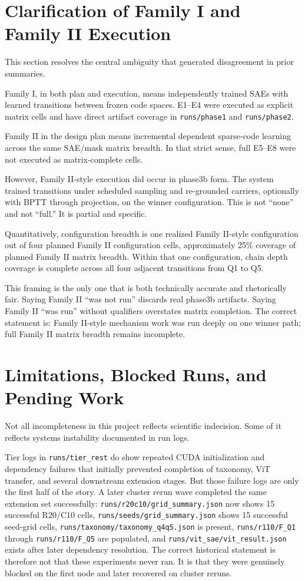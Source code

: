 \documentclass[11pt]{article}
\begin{document}
\section{Clarification of Family I and Family II Execution}
This section resolves the central ambiguity that generated disagreement in prior summaries.

Family I, in both plan and execution, means independently trained SAEs with learned transitions between frozen code spaces. E1--E4 were executed as explicit matrix cells and have direct artifact coverage in \texttt{runs/phase1} and \texttt{runs/phase2}.

Family II in the design plan means incremental dependent sparse-code learning across the same SAE/mask matrix breadth. In that strict sense, full E5--E8 were not executed as matrix-complete cells.

However, Family II-style execution did occur in phase3b form. The system trained transitions under scheduled sampling and re-grounded carriers, optionally with BPTT through projection, on the winner configuration. This is not ``none'' and not ``full.'' It is partial and specific.

Quantitatively, configuration breadth is one realized Family II-style configuration out of four planned Family II configuration cells, approximately 25\% coverage of planned Family II matrix breadth. Within that one configuration, chain depth coverage is complete across all four adjacent transitions from Q1 to Q5.

This framing is the only one that is both technically accurate and rhetorically fair. Saying Family II ``was not run'' discards real phase3b artifacts. Saying Family II ``was run'' without qualifiers overstates matrix completion. The correct statement is: Family II-style mechanism work was run deeply on one winner path; full Family II matrix breadth remains incomplete.

\section{Limitations, Blocked Runs, and Pending Work}
Not all incompleteness in this project reflects scientific indecision. Some of it reflects systems instability documented in run logs.

Tier logs in \texttt{runs/tier\_rest} do show repeated CUDA initialization and dependency failures that initially prevented completion of taxonomy, ViT transfer, and several downstream extension stages. But those failure logs are only the first half of the story. A later cluster rerun wave completed the same extension set successfully: \texttt{runs/r20c10/grid\_summary.json} now shows 15 successful R20/C10 cells, \texttt{runs/seeds/grid\_summary.json} shows 15 successful seed-grid cells, \texttt{runs/taxonomy/taxonomy\_q4q5.json} is present, \texttt{runs/r110/F\_Q1} through \texttt{runs/r110/F\_Q5} are populated, and \texttt{runs/vit\_sae/vit\_result.json} exists after later dependency resolution. The correct historical statement is therefore not that these experiments never ran. It is that they were genuinely blocked on the first node and later recovered on cluster reruns.
\end{document}
